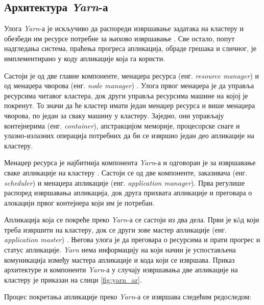 \documentclass[12pt,oneside]{memoir}
\begin{document}
\subsection{Архитектура \textit{Yarn}-а}
\label{subsec:yern_arch}

Улога \textit{Yarn}-а је искључиво да распореди извршавање задатака на кластеру и обезбеди им ресурсе потребне за њихово извршавање \cite{hadoop_learning}. Све остало, попут надгледања система, праћења прогреса апликација, обраде грешака и сличног, је имплементирано у коду апликације која га користи. %

Састоји је од две главне компоненте, менаџера ресурса (енг. \textit{resource manager}) и од менаџера чворова (енг. \textit{node manager}) \cite{hadoop_learning}. Улога првог менаџера је да управља ресурсима читавог кластера, док други управља ресурсима машине на којој је покренут. То значи да ће кластер имати један менаџер ресурса и више менаџера чворова, по један за сваку машину у кластеру. Заједно, они управљају контејнерима (енг. \textit{container}), апстракцијом меморије, процесорске снаге и улазно-излазних операција потребних да би се извршио један део апликације на кластеру.

Менаџер ресурса је најбитнија компонента \textit{Yarn}-а и одговоран је за извршавање сваке апликације на кластеру \cite{hadoop_learning}. Састоји се од две компоненте, заказивача (енг. \textit{scheduler}) и менаџера апликације (енг. \textit{application manager}). Прва регулише распоред извршавања апликација, док друга прихвата апликације и преговара о алокацији првог контејнера који им је потребан.

Апликација која се покреће преко \textit{Yarn}-а се састоји из два дела. Први је к\^{o}д који треба извршити на кластеру, док се други зове мастер апликације (енг. \textit{application master}) \cite{hadoop_learning}. Његова улога је да преговара о ресурсима и прати прогрес и статус апликације. \textit{Yarn} нема информацију на који начин је успостављена комуникација између мастера апликације и кода који се извршава. Приказ архитектуре и компоненти \textit{Yarn}-а у случају извршавања две апликације на кластеру је приказан на слици \ref{fig:yarn_ar}.

Процес покретања апликације преко \textit{Yarn}-а се извршава следећим редоследом:
\end{document}

